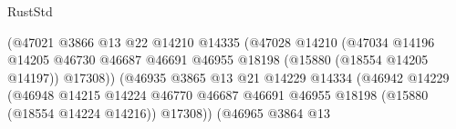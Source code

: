 \begin{lexlean}{RustStd}
\begin{coremodule}
                                                      (@47021
                                                        @3866
                                                        @13
                                                        @22
                                                        @14210
                                                        @14335
                                                        (@47028
                                                          @14210
                                                          (@47034
                                                            @14196
                                                            @14205
                                                            @46730
                                                            @46687
                                                            @46691
                                                            @46955
                                                            @18198
                                                            (@15880 (@18554 @14205 @14197))
                                                            @17308))
                                                        (@46935
                                                          @3865
                                                          @13
                                                          @21
                                                          @14229
                                                          @14334
                                                          (@46942
                                                            @14229
                                                            (@46948
                                                              @14215
                                                              @14224
                                                              @46770
                                                              @46687
                                                              @46691
                                                              @46955
                                                              @18198
                                                              (@15880 (@18554 @14224 @14216))
                                                              @17308))
                                                          (@46965
                                                            @3864
                                                            @13

\end{coremodule}
\end{lexlean}
